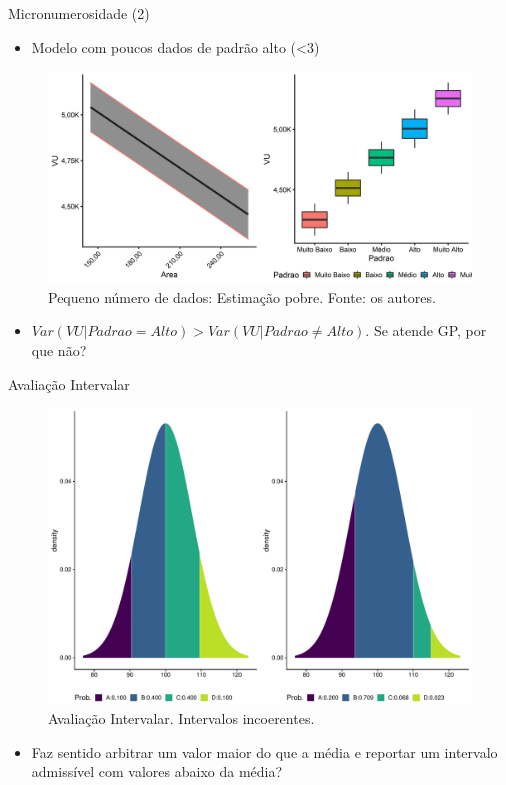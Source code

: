 \documentclass[9pt,ignorenonframetext,aspectratio=169]{beamer}
\providecommand{\tightlist}{%
  \setlength{\itemsep}{0pt}\setlength{\parskip}{0pt}}
\begin{document}
\begin{frame}{Micronumerosidade (2)}
\protect\hypertarget{micronumerosidade-2}{}

\begin{itemize}[<+->]
\tightlist
\item
  \alert<1>{Modelo com poucos dados de padrão alto (<3)}
\end{itemize}

\begin{figure}

{\centering \includegraphics[width=0.7\linewidth]{../../images/modelo1-1} 

}

\caption{Pequeno número de dados: Estimação pobre. Fonte: os autores.}\label{fig:unnamed-chunk-11}
\end{figure}

\begin{itemize}[<+->]
\tightlist
\item
  \alert<2>{$Var(VU|Padrao = Alto) > Var(VU| Padrao \ne Alto)$. Se atende GP, por que não?}
\end{itemize}

\end{frame}

\begin{frame}{Avaliação Intervalar}
\protect\hypertarget{avaliauxe7uxe3o-intervalar}{}

\begin{figure}

{\centering \includegraphics[width=0.5\linewidth]{index_files/figure-beamer/unnamed-chunk-12-1} 

}

\caption{Avaliação Intervalar. Intervalos incoerentes.}\label{fig:unnamed-chunk-12}
\end{figure}

\begin{itemize}[<+->]
\tightlist
\item
  Faz sentido arbitrar um valor maior do que a média e reportar um
  intervalo admissível com valores abaixo da média?
\end{itemize}

\end{frame}
\end{document}

